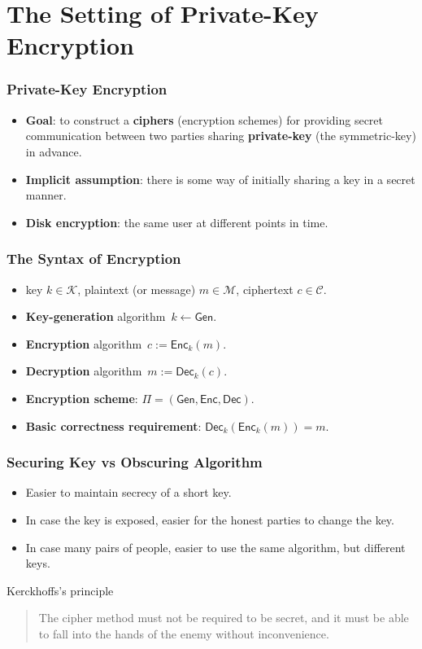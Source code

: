 \section{The Setting of Private-Key Encryption}
\begin{frame}\frametitle{Private-Key Encryption}
\begin{itemize}
\item \textbf{Goal}: to construct a \textbf{ciphers} (encryption schemes) for providing secret communication between two parties sharing \textbf{private-key} (the symmetric-key) in advance.
\item \textbf{Implicit assumption}: there is some way of initially sharing a key in a secret manner.
\item \textbf{Disk encryption}: the same user at different points in time.
\end{itemize}
\end{frame}
\begin{frame}\frametitle{The Syntax of Encryption}
\begin{figure}
\begin{center}

\end{center}
\end{figure}
\begin{itemize}
\item key $k \in \mathcal{K}$, plaintext (or message) $m \in \mathcal{M}$, ciphertext $c \in \mathcal{C}$.
\item \textbf{Key-generation} algorithm~$k \gets \mathsf{Gen}$.
\item \textbf{Encryption} algorithm~$c:= \mathsf{Enc}_k(m)$.
\item \textbf{Decryption} algorithm~$m:= \mathsf{Dec}_k(c)$.
\item \textbf{Encryption scheme}: $\Pi = (\mathsf{Gen}, \mathsf{Enc}, \mathsf{Dec})$.
\item \textbf{Basic correctness requirement}: $\mathsf{Dec}_k(\mathsf{Enc}_k(m)) = m$.
\end{itemize}
\end{frame}
\begin{frame}\frametitle{Securing Key vs Obscuring Algorithm}
\begin{itemize}
\item Easier to maintain secrecy of a short key.
\item In case the key is exposed, easier for the honest parties to change the key.
\item In case many pairs of people, easier to use the same algorithm, but different keys.
\end{itemize}
\begin{alertblock}{Kerckhoffs's principle}
\begin{quote}
The cipher method must not be required to be secret, and it must be able to fall into the hands of the enemy without inconvenience.
\end{quote}	
\end{alertblock}
\end{frame}
